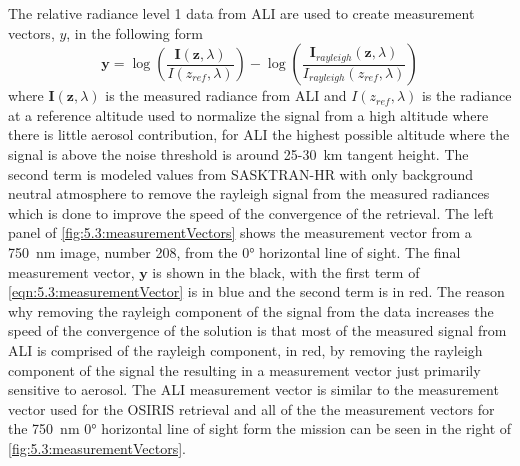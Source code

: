The relative radiance level 1 data from ALI are used to create measurement vectors, $y$, in the following form
\begin{equation}
    \mathbf{y} = \log\left(\frac{\mathbf{I}(\mathbf{z},\lambda)}{I(z_{ref},\lambda)}\right)-\log\left(\frac{\mathbf{I}_{rayleigh}(\mathbf{z},\lambda)}{I_{rayleigh}(z_{ref},\lambda)}\right)
    \label{eqn:5.3:measurementVector}
\end{equation}
where $\mathbf{I}(\mathbf{z},\lambda)$ is the measured radiance from ALI and $I(z_{ref},\lambda)$ is the radiance at a reference altitude used to normalize the signal from a high altitude where there is little aerosol contribution, for ALI the highest possible altitude where the signal is above the noise threshold is around 25-30~km tangent height. The second term is modeled values from SASKTRAN-HR with only background neutral atmosphere to remove the rayleigh signal from the measured radiances which is done to improve the speed of the convergence of the retrieval. The left panel of \autoref{fig:5.3:measurementVectors} shows the measurement vector from a 750~nm image, number 208, from the 0\si{\degree} horizontal line of sight. The final measurement vector, $\mathbf{y}$ is shown in the black, with the first term of \autoref{eqn:5.3:measurementVector} is in blue and the second term is in red. The reason why removing the rayleigh component of the signal from the data increases the speed of the convergence of the solution is that most of the measured signal from ALI is comprised of the rayleigh component, in red, by removing the rayleigh component of the signal the resulting in a measurement vector just primarily sensitive to aerosol. The ALI measurement vector is similar to the measurement vector used for the OSIRIS retrieval \citep{Bourassa2007,Bourassa2011} and all of the the measurement vectors for the 750~nm 0\si{\degree} horizontal line of sight form the mission can be seen in the right of \autoref{fig:5.3:measurementVectors}.

